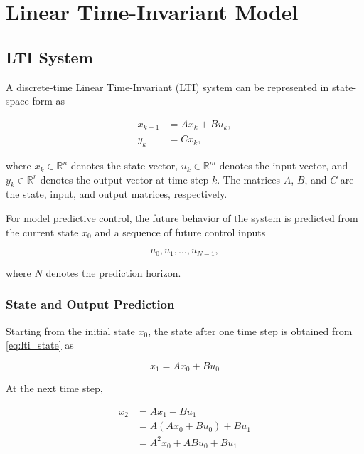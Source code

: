 \chapter{Linear Time-Invariant Model}

\section{LTI System}

A discrete-time Linear Time-Invariant (LTI) system can be represented in state-space form as

\begin{align}
    x_{k+1} &= A x_k + B u_k, \label{eq:lti_state}\\
    y_k &= C x_k, \label{eq:lti_output}
\end{align}

where \(x_k \in \mathbb{R}^{n}\) denotes the state vector, 
\(u_k \in \mathbb{R}^{m}\) denotes the input vector, and 
\(y_k \in \mathbb{R}^{r}\) denotes the output vector at time step \(k\).
The matrices \(A\), \(B\), and \(C\) are the state, input, and output matrices, respectively.

For model predictive control, the future behavior of the system is predicted from the current state \(x_0\) and a sequence of future control inputs

\begin{equation}
    u_0,u_1,\ldots,u_{N-1},
\end{equation}

where \(N\) denotes the prediction horizon.

\subsection{State and Output Prediction}

Starting from the initial state \(x_0\), the state after one time step is obtained from \cref{eq:lti_state} as

\begin{equation}
    x_1 = A x_0 + B u_0
\end{equation}

At the next time step,

\begin{align}
    x_2
    &= A x_1 + B u_1 \\
    &= A(Ax_0 + Bu_0) + Bu_1 \\
    &= A^2x_0 + ABu_0 + Bu_1
\end{align}

